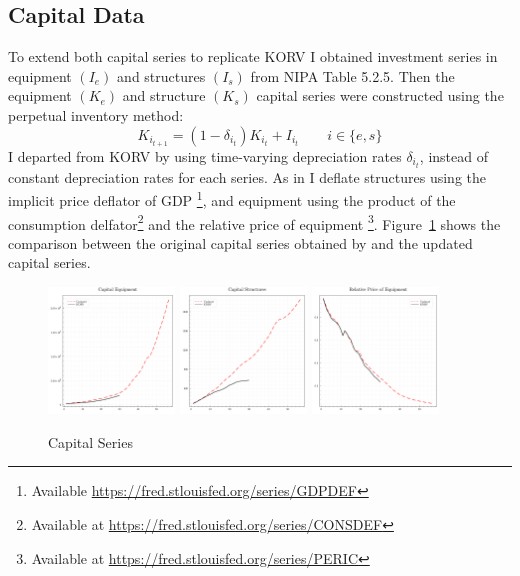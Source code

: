\documentclass[12pt]{article}
\begin{document}
\subsection{Capital Data}\label{sec:capital_data}
To extend both capital series to replicate KORV I obtained investment series in equipment $(I_e)$ and structures $(I_s)$ from NIPA Table 5.2.5. Then the equipment $(K_e)$ and structure $(K_s)$ capital series were constructed using the perpetual inventory method:
\begin{equation}\label{eq:capital_law_motion}
 K_{i_{t+1}} = (1 - \delta_{i_t}) K_{i_{t}} + I_{i_{t}} \qquad i\in\{e, s\}
\end{equation}
\noindent
I departed from KORV by using time-varying depreciation rates $\delta_{i_t}$, instead of constant depreciation rates for each series. As in \citep{ohanian2021revisiting} I deflate structures using the implicit price deflator of GDP \footnote{Available \url{https://fred.stlouisfed.org/series/GDPDEF}}, and equipment using the product of the consumption delfator\footnote{Available at \url{https://fred.stlouisfed.org/series/CONSDEF}} and the relative price of equipment \footnote{Available at \url{https://fred.stlouisfed.org/series/PERIC}}. Figure~\ref*{fig:capital_series} shows the comparison between the original capital series obtained by \citep{krusell2000capital} and the updated capital series. 

\begin{figure}%
\centering
\includegraphics[width=0.3\textwidth]{../images/capital_equipment_doc.pdf}
\hfill
\includegraphics[width=0.3\textwidth]{../images/capital_structures_doc.pdf}
\hfill
\includegraphics[width=0.3\textwidth]{../images/capital_price_doc.pdf}
\caption{\label{fig:capital_series} Capital Series}
\end{figure}
\end{document}
